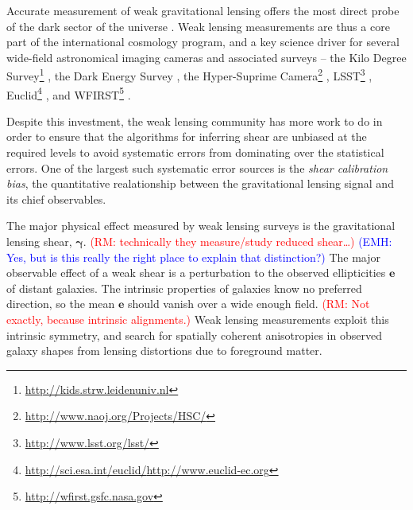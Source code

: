 \documentclass[iop]{emulateapj}
\newcommand\rmcomment[1]{\textcolor{red}{(RM: #1)}}
\newcommand\emhcomment[1]{\textcolor{blue}{(EMH: #1)}}
\begin{document}
Accurate measurement of weak gravitational lensing offers the most
direct probe of the dark sector of the universe
\citep[e.g.,][]{2001PhR...340..291B,2003ARA&A..41..645R,schneider06,2008ARNPS..58...99H,2010RPPh...73h6901M,2013PhR...530...87W}.
Weak lensing measurements are thus a core part of the international
cosmology program, and a key science driver for several wide-field
astronomical imaging cameras and associated surveys -- the Kilo Degree
Survey\footnote{\url{http://kids.strw.leidenuniv.nl}}
\citep{KiDS_main}, the Dark Energy Survey \citep{DES_main}, the
Hyper-Suprime Camera\footnote{\url{http://www.naoj.org/Projects/HSC/}}
\citep{HSC_main}, LSST\footnote{\url{http://www.lsst.org/lsst/}}
\citep{2009arXiv0912.0201L},
Euclid\footnote{\url{http://sci.esa.int/euclid/}\url{http://www.euclid-ec.org}}
\citep{2011arXiv1110.3193L}, and
WFIRST\footnote{\url{http://wfirst.gsfc.nasa.gov}}
\citep{2015arXiv150303757S}.

Despite this investment, the weak lensing community has more work to
do in order to ensure that the algorithms for inferring shear are
unbiased at the required levels to avoid systematic errors from
dominating over the statistical errors.
One of the largest such systematic error sources is the {\it shear
  calibration bias}, the quantitative realationship between the
gravitational lensing signal and its chief observables.

The major physical effect measured by weak lensing surveys is the
gravitational lensing shear,
$\boldsymbol{\gamma}$. \rmcomment{technically they measure/study
  reduced shear\dots} \emhcomment{Yes, but is this really the right
  place to explain that distinction?} The major observable effect of a
weak shear is a perturbation to the observed ellipticities
$\boldsymbol{e}$ of distant galaxies. The intrinsic properties of
galaxies know no preferred direction, so the mean $\boldsymbol{e}$
should vanish over a wide enough field. \rmcomment{Not exactly,
  because intrinsic alignments.}  Weak lensing measurements exploit
this intrinsic symmetry, and search for spatially coherent
anisotropies in observed galaxy shapes from lensing distortions due to
foreground matter.
\end{document}
